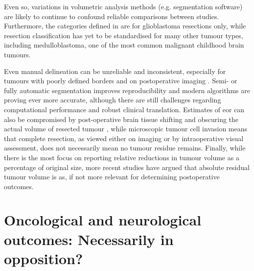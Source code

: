 Even so, variations in volumetric analysis methods (e.g. segmentation software) are likely to continue to confound reliable comparisons between studies.
Furthermore, the categories defined in \textcite{Karschnia2021} are for glioblastoma resections only, while resection classification has yet to be standardised for many other tumour types, including medulloblastoma\autocite{Thompson2018}, one of the most common malignant childhood brain tumours.

Even manual delineation can be unreliable and inconsistent, especially for tumours with poorly defined borders and on postoperative imaging \autocite{Ertl-Wagner2009,Bo2017,Visser2019}.
Semi- or fully automatic segmentation improves reproducibility\autocite{Ertl-Wagner2009,Sezer2020} and modern algorithms are proving ever more accurate, although there are still challenges regarding computational performance and robust clinical translation\autocite{Angulakshmi2017,Wadhwa2019,Fawzi2021}.
Estimates of \gls{eor} can also be compromised by post-operative brain tissue shifting and obscuring the actual volume of resected tumour \autocite{Schucht2014a}, while microscopic tumour cell invasion means that complete resection, as viewed either on imaging or by intraoperative visual assessment, does not necessarily mean no tumour residue remains\autocite{Yordanova2017}.
Finally, while there is the most focus on reporting relative reductions in tumour volume as a percentage of original size, more recent studies have argued that absolute residual tumour volume is as, if not more relevant for determining postoperative outcomes\autocite{Ius2012,Rincon-Torroella2019,Smith2008,Karschnia2021}.

\section{Oncological and neurological outcomes: Necessarily in opposition?}

